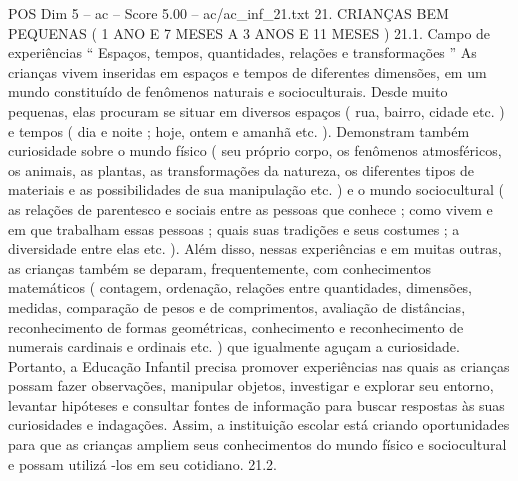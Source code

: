 \begin{textsample}{POS Dim 5 – ac – Score 5.00 – ac/ac\_inf\_21.txt}  \label{ex:f5_pos_130}
21.
CRIANÇAS BEM PEQUENAS ( 1 ANO E 7 MESES A 3 ANOS E 11 MESES ) 21.1.
Campo de experiências “ Espaços, tempos, quantidades, relações e transformações ” As crianças vivem inseridas em espaços e tempos de diferentes dimensões, em um mundo constituído de fenômenos naturais e socioculturais.
Desde muito pequenas, elas procuram se situar em diversos espaços ( rua, bairro, cidade etc. ) e tempos ( dia e noite ; hoje, ontem e amanhã etc. ).
Demonstram também curiosidade sobre o mundo físico ( seu próprio corpo, os fenômenos atmosféricos, os animais, as plantas, as transformações da natureza, os diferentes tipos de materiais e as possibilidades de sua manipulação etc. ) e o mundo sociocultural ( as relações de parentesco e sociais entre as pessoas que conhece ; como vivem e em que trabalham essas pessoas ; quais suas tradições e seus costumes ; a diversidade entre elas etc. ).
Além disso, nessas experiências e em muitas outras, as crianças também se deparam, frequentemente, com conhecimentos matemáticos ( contagem, ordenação, relações entre quantidades, dimensões, medidas, comparação de pesos e de comprimentos, avaliação de distâncias, reconhecimento de formas geométricas, conhecimento e reconhecimento de numerais cardinais e ordinais etc. ) que igualmente aguçam a curiosidade.
Portanto, a Educação Infantil precisa promover experiências nas quais as crianças possam fazer observações, manipular objetos, investigar e explorar seu entorno, levantar hipóteses e consultar fontes de informação para buscar respostas às suas curiosidades e indagações.
Assim, a instituição escolar está criando oportunidades para que as crianças ampliem seus conhecimentos do mundo físico e sociocultural e possam utilizá -los em seu cotidiano. 21.2.

\end{textsample}
